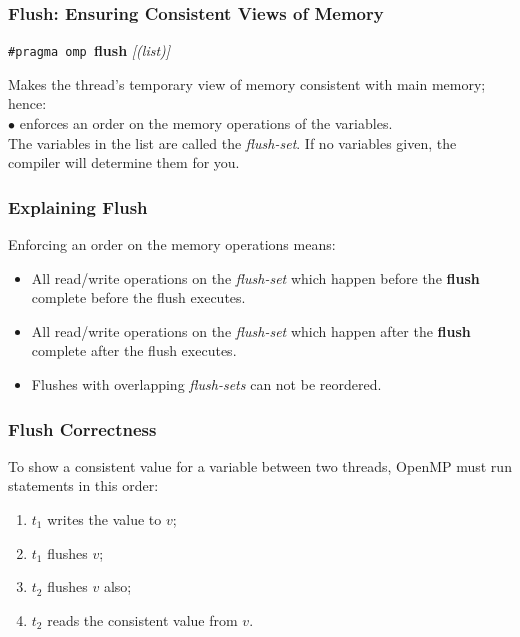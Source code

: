 \begin{frame}[fragile]
  \frametitle{Flush: Ensuring Consistent Views of Memory}

  \begin{center}
    {\tt \#pragma omp }{\bf flush} {\it[(list)]}
  \end{center}

  
    Makes the thread's temporary view of memory consistent with main
      memory; hence:\\[1em]
    $\bullet$ enforces an order on the memory operations of the variables.\\[1em]
    The variables in the list are called the {\it flush-set}. 
    If no variables given, the compiler will determine them for you.
  
\end{frame}

\begin{frame}
  \frametitle{Explaining Flush}

  
  Enforcing an order on the memory operations means:

  \begin{itemize}
    \item All read/write operations on the {\it flush-set} which happen
      before the {\bf flush} complete before the flush executes.
    \item All read/write operations on the {\it flush-set} which happen
      after the {\bf flush} complete after the flush executes.
    \item Flushes with overlapping {\it flush-sets} can not be reordered.
  \end{itemize}
  
\end{frame}

\begin{frame}
  \frametitle{Flush Correctness}

  
  To show a consistent value for a variable between two threads, 
  OpenMP must run statements in this order:

  \begin{enumerate}
    \item $t_1$ writes the value to $v$;
    \item $t_1$ flushes $v$; 
    \item $t_2$ flushes $v$ also;
    \item $t_2$ reads the consistent value from $v$.
  \end{enumerate}
  
\end{frame}

